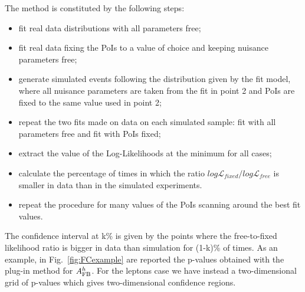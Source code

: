 The method is constituted by the following steps:
\begin{itemize}
\item fit real data distributions with all parameters free;
\item fit real data fixing the PoIs to a value of choice and keeping nuisance parameters free;
\item generate simulated events following the distribution given by the fit model,
where all nuisance parameters are taken from the fit in point 2 and PoIs are fixed to the same value used in point 2;
\item repeat the two fits made on data on each simulated sample: fit with all parameters free and fit with PoIs fixed;
\item extract the value of the Log-Likelihoods at the minimum for all cases;
\item calculate the percentage of times in which the ratio
$log\mathcal{L}_{fixed}/log\mathcal{L}_{free}$ is smaller in data than in the simulated experiments.
\item repeat the procedure for many values of the PoIs scanning around the best fit values.
\end{itemize}

The confidence interval at k\% is given by the points where the free-to-fixed likelihood ratio is bigger in data than
simulation for (1-k)\% of times. As an example, in Fig.~\ref{fig:FCexample} are reported the p-values obtained
with the plug-in method for $A_{\rm FB}^h$. For the leptons case we have instead a two-dimensional grid of p-values
which gives two-dimensional confidence regions.

